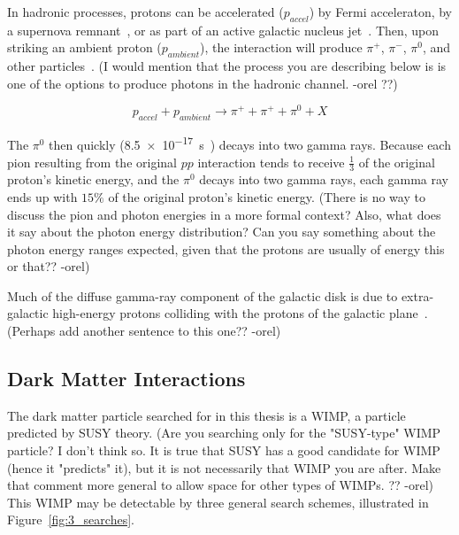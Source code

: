  In hadronic processes, protons can be accelerated ($p_{accel}$) by Fermi acceleraton, by a supernova remnant~\cite{proton_snr_accel}, or as part of an active galactic nucleus jet~\cite{hadronic1,hadronic2}.
  Then, upon striking an ambient proton ($p_{ambient}$), the interaction will produce $\pi^{+}$, $\pi^{-}$, $\pi^{0}$, and other particles~\cite{pp_pion,pp_pion2}.
  {\color{red}(I would mention that the process you are describing below is is one of the options to produce photons in the hadronic channel. -orel ??)}
  
  \begin{equation}\nonumber
    p_{accel} + p_{ambient} \rightarrow \pi^+ + \pi^+ + \pi^0 + X
  \end{equation}

  The $\pi^{0}$ then quickly (\SI{8.5e-17}{s}~\cite{pdg2016}) decays into two gamma rays.
  Because each pion resulting from the original $pp$ interaction tends to receive $\frac{1}{3}$ of the original proton's kinetic energy, and the $\pi^0$ decays into two gamma rays, each gamma ray ends up with \nicetilde$15\%$ of the original proton's kinetic energy.
  {\color{red}(There is no way to discuss the pion and photon energies in a more formal context? Also, what does it say about the photon energy distribution? Can you say something about the photon energy ranges expected, given that the protons are usually of energy this or that?? -orel)}
  
  Much of the diffuse gamma-ray component of the galactic disk is due to extra-galactic high-energy protons colliding with the protons of the galactic plane~\cite{GalacticDiffuseGammaRays}.
  {\color{red}(Perhaps add another sentence to this one?? -orel)}

  \subsection{Dark Matter Interactions}\label{dmgammaproduction}
    
    The dark matter particle searched for in this thesis is a WIMP, a particle predicted by SUSY theory.
    {\color{red}(Are you searching only for the "SUSY-type" WIMP particle? I don't think so. It is true that SUSY has a good candidate for WIMP (hence it "predicts" it), but it is not necessarily that WIMP you are after. Make that comment more general to allow space for other types of WIMPs. ?? -orel)}
    This WIMP may be detectable by three general search schemes, illustrated in Figure~\ref{fig:3_searches}.

